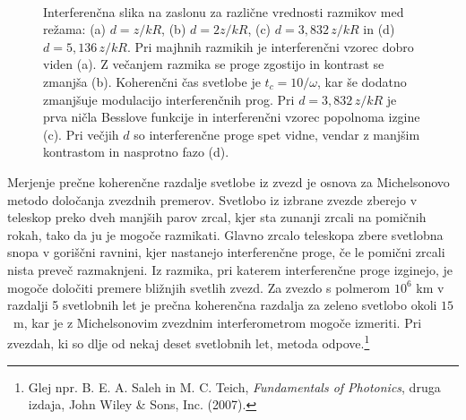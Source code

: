 \begin{figure}[ht]
\begin{center}
\quad
{}\\
\quad
{}
\caption{Interferenčna slika na zaslonu
za različne vrednosti razmikov med režama: (a) $d = z/kR$, (b) $d=2z/kR$, 
(c) $d = 3,832\,z/kR$ in (d) $d = 5,136\,z/kR$. Pri majhnih razmikih je interferenčni vzorec
dobro viden (a).
Z večanjem razmika se proge zgostijo in kontrast se zmanjša (b). Koherenčni
čas svetlobe je $t_{c}=10/\omega$, kar še dodatno zmanjšuje modulacijo
interferenčnih prog. Pri $d=3,832\,z/kR$ je prva ničla Besslove
funkcije in interferenčni vzorec popolnoma izgine (c). Pri večjih $d$ so interferenčne
proge spet vidne, vendar z manjšim kontrastom in nasprotno fazo (d).}
\label{fig:Interferencna-slika}
\end{center}
\end{figure}

\begin{remark}
Merjenje prečne koherenčne razdalje svetlobe iz
zvezd je osnova za Michelsonovo metodo določanja zvezdnih premerov.
Svetlobo iz izbrane zvezde zberejo v teleskop preko dveh manjših parov
zrcal, kjer sta zunanji zrcali na pomičnih rokah, tako da ju je mogoče
razmikati. Glavno zrcalo teleskopa zbere svetlobna snopa v goriščni
ravnini, kjer nastanejo interferenčne proge, če le pomični zrcali
nista preveč razmaknjeni. Iz razmika, pri katerem interferenčne proge
izginejo, je mogoče določiti premere bližnjih svetlih zvezd. Za zvezdo
s polmerom $10^{6}$ km v razdalji 5 svetlobnih let je prečna koherenčna
razdalja za zeleno svetlobo okoli $15$~m, kar je z Michelsonovim
zvezdnim interferometrom mogoče izmeriti. Pri zvezdah, ki so dlje
od nekaj deset svetlobnih let, metoda odpove.\footnote{Glej npr. B. E. A. Saleh in M. C. Teich, 
{\it Fundamentals of Photonics}, druga izdaja, John Wiley \& Sons, Inc. (2007).}
\end{remark}

